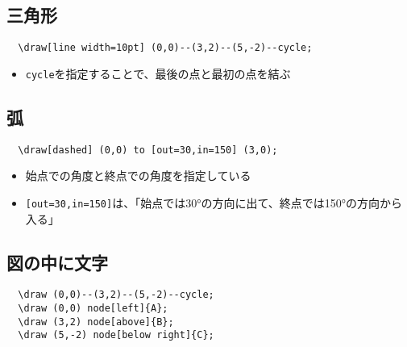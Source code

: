 \documentclass[16pt,b5paper]{article}
\begin{document}
\subsection{三角形}


\begin{lstlisting}
  \draw[line width=10pt] (0,0)--(3,2)--(5,-2)--cycle;
\end{lstlisting}

\begin{itemize}
  \item \verb|cycle|を指定することで、最後の点と最初の点を結ぶ
\end{itemize}

\subsection{弧}


\begin{lstlisting}
  \draw[dashed] (0,0) to [out=30,in=150] (3,0);
\end{lstlisting}

\begin{itemize}
  \item 始点での角度と終点での角度を指定している
  \item \verb|[out=30,in=150]|は、「始点では30°の方向に出て、終点では150°の方向から入る」
\end{itemize}

\subsection{図の中に文字}


\begin{lstlisting}
  \draw (0,0)--(3,2)--(5,-2)--cycle;
  \draw (0,0) node[left]{A};
  \draw (3,2) node[above]{B};
  \draw (5,-2) node[below right]{C};
\end{lstlisting}
\end{document}
